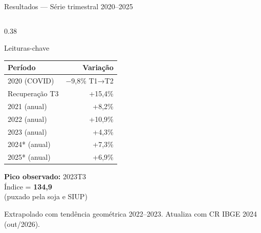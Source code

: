\documentclass[aspectratio=169, 11pt]{beamer}
\begin{document}
\begin{frame}{Resultados — Série trimestral 2020--2025}
\begin{columns}[T]
    \begin{column}{0.38\textwidth}
      \small
      \begin{block}{Leituras-chave}
        \renewcommand{\arraystretch}{1.3}
        \begin{tabular}{lr}
          \textbf{Período} & \textbf{Variação} \\
          \hline
          2020 (COVID) & \color{seplanred}$-$9,8\% T1→T2 \\
          Recuperação T3 & \color{seplangreen}+15,4\% \\
          \hline
          2021 (anual) & \color{seplangreen}+8,2\% \\
          2022 (anual) & \color{seplangreen}+10,9\% \\
          2023 (anual) & \color{seplangreen}+4,3\% \\
          \hline
          2024* (anual) & \color{seplangreen}+7,3\% \\
          2025* (anual) & \color{seplangreen}+6,9\% \\
        \end{tabular}
      \end{block}

      \vspace{0.2cm}
      {\small \color{seplanblue}
      \textbf{Pico observado:} 2023T3\\
      Índice = \textbf{134,9}\\
      (puxado pela soja e SIUP)
      }

      \vspace{0.2cm}
      {\tiny * Extrapolado com tendência geométrica 2022--2023.
      Atualiza com CR IBGE 2024 (out/2026).}
    \end{column}
  \end{columns}

\end{frame}
\end{document}
